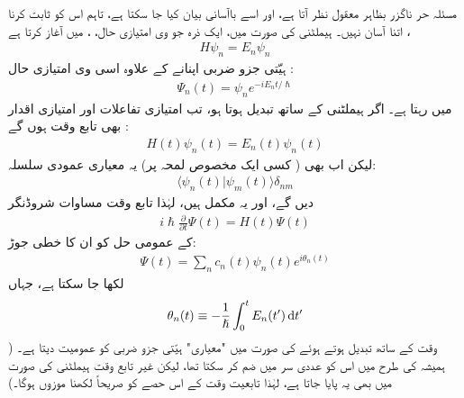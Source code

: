  
مسئلہ حر ناگزر بظاہر معقول نظر آتا ہے،  اور اسے باآسانی بیان کیا جا سکتا ہے،  تاہم اس کو ثابت کرنا اتنا آسان نہیں۔   ہیملٹنی کی صورت میں،  ایک ذرہ جو  وی امتیازی حال، ،   میں آغاز کرتا ہے ،
\begin{align}
H \psi_n = E_n \psi_n
\end{align}
 ہیّتی  جزو ضربی اپنانے کے علاوہ اسی  وی امتیازی حال :
\begin{align}
\Psi_n (t) = \psi_n e^{-i E_n t/ \hslash}
\end{align}
میں رہتا ہے۔  اگر ہیملٹنی   کے ساتھ تبدیل ہوتا ہو،  تب امتیازی تفاعلات اور امتیازی اقدار بھی تابع وقت ہوں گے :
\begin{align}\label{مساوات_حر_تابع_وقت_ہیملٹنی_توانائی}
H(t) \psi_n (t) = E_n (t) \psi_n (t)
\end{align}
لیکن اب بھی ( کسی ایک مخصوص لمحہ پر)  یہ معیاری  عمودی سلسلہ: 
\begin{align}\label{مساوات_حر_لمحاتی_معیاری_عمودی}
\langle \psi_n (t) | \psi_m (t) \rangle \delta_{nm} 
\end{align}
دیں گے، اور یہ     مکمل ہیں،  لہٰذا تابع وقت مساوات شروڈنگر 
\begin{align}\label{مساوات_حر_مساوات_شروڈنگر_الف}
i \hslash \frac{\partial}{\partial t} \Psi (t) = H (t) \Psi (t)
\end{align}
کے عمومی حل کو ان کا خطی جوڑ:
\begin{align}\label{مساوات_حر_مساوات_شروڈنگر_ب}
\Psi (t) = \sum_n c_n (t) \psi_n (t) e^{i \theta_n (t)}
\end{align}
لکھا جا سکتا ہے، جہاں 
\begin{align}\label{مساوات_حر_مساوات_شروڈنگر_پ}
\theta_n (t) \equiv  - \frac{1}{\hslash} \int_0^t E_n (t') \dif t'
\end{align}
وقت کے ساتھ تبدیل ہوتے ہوئے  کی صورت میں "معیاری"   ہیّتی جزو ضربی کو عمومیت دیتا ہے۔ (  ہمیشہ کی طرح میں اس کو  عددی سر  میں ضم  کر سکتا تھا،  لیکن غیر تابع وقت ہیملٹنی کی صورت میں بھی یہ پایا جاتا ہے،  لہٰذا  تابعیت  وقت کے اس حصے  کو صریحاً  لکھنا موزوں ہوگا۔) 


